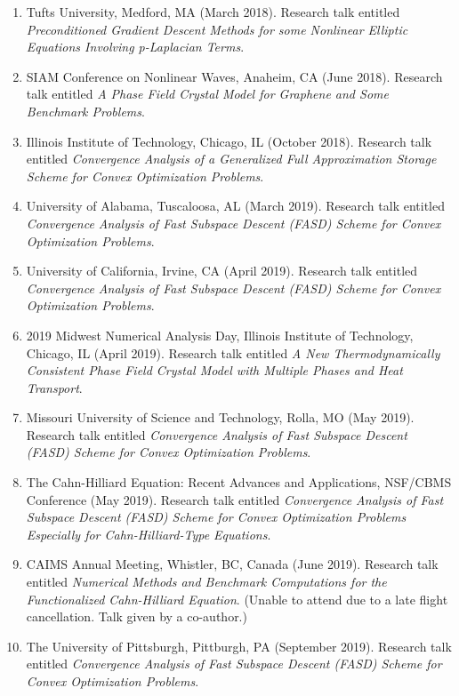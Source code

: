 \documentclass[11pt]{letter}
\begin{document}
\begin{enumerate}
	\item
Tufts University, Medford, MA (March 2018).  Research talk entitled {\sl Preconditioned Gradient Descent Methods for some Nonlinear Elliptic Equations Involving p-Laplacian Terms}.
	\item
SIAM Conference on Nonlinear Waves, Anaheim, CA (June 2018). Research talk entitled {\sl A Phase Field Crystal Model for Graphene and Some Benchmark Problems}.
	\item
Illinois Institute of Technology, Chicago, IL (October 2018).  Research talk entitled {\sl Convergence Analysis of a Generalized Full Approximation Storage Scheme for Convex Optimization Problems}.
	\item
University of Alabama, Tuscaloosa, AL (March 2019).  Research talk entitled {\sl Convergence Analysis of Fast Subspace Descent (FASD) Scheme for Convex Optimization Problems}.
	\item
University of California, Irvine, CA (April 2019).  Research talk entitled {\sl Convergence Analysis of Fast Subspace Descent (FASD) Scheme for Convex Optimization Problems}.
	\item
2019 Midwest Numerical Analysis Day, Illinois Institute of Technology, Chicago, IL (April 2019).  Research talk entitled {\sl A New Thermodynamically Consistent Phase Field Crystal Model with Multiple Phases and Heat Transport}.
	\item
Missouri University of Science and Technology, Rolla, MO (May 2019).  Research talk entitled {\sl Convergence Analysis of Fast Subspace Descent (FASD) Scheme for Convex Optimization Problems}.
	\item
The Cahn-Hilliard Equation: Recent Advances and Applications, NSF/CBMS Conference (May 2019). Research talk entitled {\sl Convergence Analysis of Fast Subspace Descent (FASD) Scheme for Convex Optimization Problems Especially for Cahn-Hilliard-Type Equations}.
	\item
CAIMS Annual Meeting, Whistler, BC, Canada (June 2019). Research talk entitled {\sl Numerical Methods and Benchmark Computations for the Functionalized Cahn-Hilliard Equation}. (Unable to attend due to a late flight cancellation. Talk given by a co-author.)
	\item
The University of Pittsburgh, Pittburgh, PA (September 2019).  Research talk entitled {\sl Convergence Analysis of Fast Subspace Descent (FASD) Scheme for Convex Optimization Problems}.

	\end{enumerate}
\end{document}
